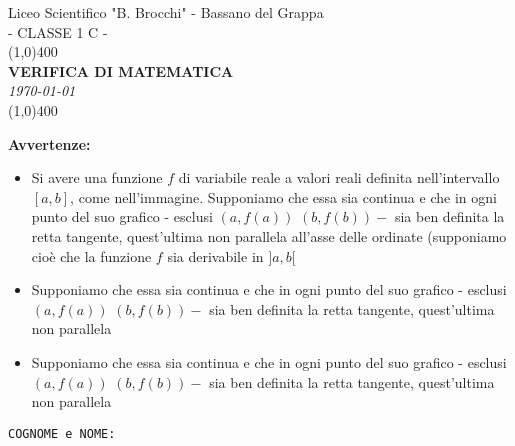 \documentclass[10pt,a4paper]{exam}
\begin{document}
\begin{titlepage}

\begin{center}
	\Large{Liceo Scientifico "B. Brocchi" - Bassano del Grappa}\\[6pt]
	\large{- CLASSE 1 C -}\\
	\vspace{4cm}
	\line(1,0){400}\\[3.5mm]
	{\huge{\textbf{VERIFICA DI MATEMATICA}}}\\[3mm]
	\textit{\today}\\[1mm]	
	\line(1,0){400}\\
	\vspace{5cm}
\end{center}

\begin{adjustwidth}{1.5cm}{1.5cm}
\textbf{Avvertenze:}\\[6pt]
	\begin{itemize}
		\item 
			Si avere una funzione $f$ di variabile reale a valori reali definita nell'intervallo $[a, b]$, come nell'immagine. Supponiamo che essa sia continua e che in ogni punto del suo grafico - esclusi $(a, f(a))$ $(b, f(b))-$ sia ben definita la retta tangente, quest'ultima non parallela all'asse delle ordinate (supponiamo cioè che la funzione $f$ sia derivabile in $] a, b[$\\
			\item 
			Supponiamo che essa sia continua e che in ogni punto del suo grafico - esclusi $(a, f(a))$ $(b, f(b))-$ sia ben definita la retta tangente, quest'ultima non parallela\\
			\item 
			Supponiamo che essa sia continua e che in ogni punto del suo grafico - esclusi $(a, f(a))$ $(b, f(b))-$ sia ben definita la retta tangente, quest'ultima non parallela\\
		\end{itemize}
\end{adjustwidth}

\vfill
	\begin{center}
	\vspace{18pt}
	{\Large{\tt COGNOME e NOME:}}\quad \underline{\hspace{2.8in}}\\
	\end{center}
\end{titlepage}
\end{document}
